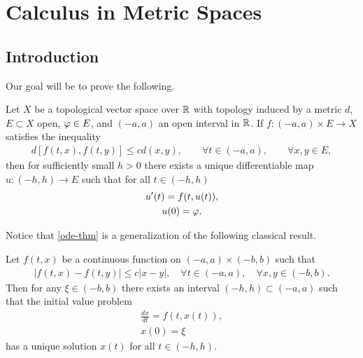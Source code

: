 \chapter{Calculus in Metric Spaces}
\section{Introduction}
%
%
%
%
%
%
%
%
%
%
%


Our goal will be to prove the following.
%
%
%
%
%
%
%
%
\begin{theorem}
	\label{ode-thm}
  Let $X$ be a topological vector space over $\mathbb{R}$
  with topology induced by a metric $d$, $E \subset X$ open, $\varphi \in E$, and $(-a, a)$ an
	open interval in $\mathbb{R}$. If $f: (-a, a) \times E \to X$ satisfies the
	inequality
	\begin{equation}
		\label{stronger-ode}
		\begin{split}
      d[f(t, x), f(t, y)] \le c d(x, y), \qquad \forall t \in (-a, a),
			\qquad \forall x, y \in E,
		\end{split}
	\end{equation}
  then for sufficiently small $h > 0$ there exists a unique
	differentiable map $u: (-h, h) \to E$ such that for all $t \in (-h, h)$
	\begin{gather}
    \label{ode-thm-eq}
			u'(t) = f(t, u(t)),
			\\
      \label{ode-thm-init-data}
			u(0) = \varphi.
	\end{gather}
\end{theorem}
%
%
Notice that \autoref{ode-thm} is a 
generalization of the following classical result.
%
%
%
%
%
%
%
%
\begin{theorem}
	Let $f(t, x)$ be a continuous function on $(- a, a) \times (- b,
	b)$ such that
	\begin{equation*}
		\begin{split}
			| f(t, x) - f(t, y) | \le c| x - y |, \quad \forall t \in (-a, a),
			\quad \forall x,y \in (- b, b).
		\end{split}
	\end{equation*}
	Then for any $\xi \in (-b, b)$ there exists an interval $(-h, h)
	\subset (-a, a)$ such that the initial value problem
	\begin{gather}
			\frac{dx}{dt} = f(t, x(t)),
			\\
			x(0) = \xi 
	\end{gather}
	has a unique solution $x(t)$ for all $t \in (-h, h)$.
	\end{theorem}
